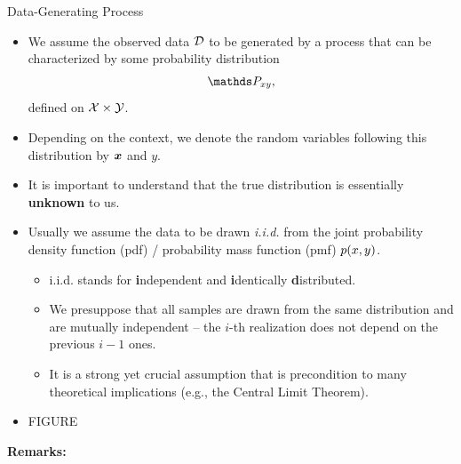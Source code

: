 \documentclass[11pt,compress,t,notes=noshow, xcolor=table]{beamer}
\begin{document}

\begin{vbframe}{Data-Generating Process}

\begin{itemize}

  \item We assume the observed data $\mathcal{D}$ to be generated by a process that can
  be characterized by some probability distribution $$\Pxy,$$ defined on 
  $\mathcal{X} \times \mathcal{Y}$.
  
  \item Depending on the context, we denote the random variables following this 
  distribution by $\bm{x}$ and $y$.
  
  \item It is important to understand that the true distribution is essentially 
  \textbf{unknown} to us.
  
  \framebreak
  
  \item Usually we assume the data to be drawn \emph{i.i.d.} from the joint 
  probability density function (pdf) / probability mass function (pmf) $p(x,y)$.
  
  \begin{itemize}
  
    \small
  
    \item i.i.d. stands for \textbf{i}ndependent and \textbf{i}dentically 
    \textbf{d}istributed.
    
    \item We presuppose that all samples are drawn from the same distribution 
    and are mutually independent -- the $i$-th realization does not depend on the
    previous $i-1$ ones.
    
    \item It is a strong yet crucial assumption that is precondition to many
    theoretical implications (e.g., the Central Limit Theorem).
    
    \normalsize
  
  \end{itemize}
  
  \item \color{red} FIGURE

\end{itemize}



\framebreak

\textbf{Remarks:}


\end{vbframe}
\end{document}
